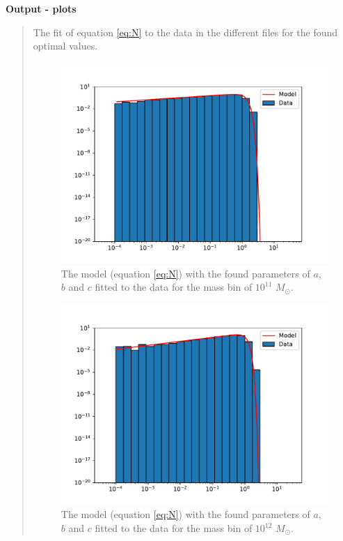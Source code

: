 \textbf{Output - plots}
\begin{quote}
The fit of equation \ref{eq:N} to the data in the different files for the found optimal values. 

\begin{figure}[!h]
\centering
\includegraphics[scale=0.7]{plots/satgals_m11.pdf}
\caption{The model (equation \ref{eq:N}) with the found parameters of $a$, $b$ and $c$ fitted to the data for the mass bin of $10^{11}$ $M_{\odot}$.}

\end{figure}
\newpage

\begin{figure}[!h]
\centering
\includegraphics[scale=0.7]{plots/satgals_m12.pdf}
\caption{The model (equation \ref{eq:N}) with the found parameters of $a$, $b$ and $c$ fitted to the data for the mass bin of $10^{12}$ $M_{\odot}$.}


\end{figure}
\end{quote}
